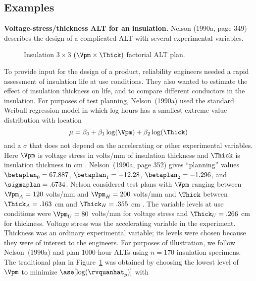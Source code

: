 \subsection{Examples}

\begin{example}
\label{example:tvalt.insulation.volt.thick}
{\bf Voltage-stress/thickness ALT for an insulation.}  Nelson
(1990a, page 349) describes the design of a complicated ALT with
several experimental variables.
\begin{figure}
\caption{Insulation  $3 \times 3$ $ (\Vpm \times \Thick)$
factorial ALT plan.}
\label{figure:nelson.tvalt.ps}
\end{figure}
To provide input for the design of a product, reliability engineers
needed a rapid assessment of insulation life at use conditions. They
also wanted to estimate the effect of insulation thickness on life,
and to compare different conductors in the insulation.  For purposes
of test planning, Nelson~(1990a) used the standard Weibull regression
model in which log hours has a smallest extreme value distribution
with location
\begin{displaymath}
\mu=\beta_{0}+\beta_{1} \log(\Vpm) + \beta_{2} \log(\Thick)
\end{displaymath}
and a $\sigma$ that does not depend on the accelerating or other
experimental variables. Here $\Vpm$ is voltage stress in volts/mm of
insulation thickness and $\Thick$ is insulation thickness in cm .
Nelson~(1990a, page 352) gives ``planning'' values
$\betaplan_{0}=67.887$, $\betaplan_{1}=-12.28$,
$\betaplan_{2}=-1.296$, and $\sigmaplan=.6734$.  Nelson considered
test plans with $\Vpm$ ranging between $\Vpm_{A}=120$ volts/mm and
$\Vpm_{H}=200$ volts/mm and $\Thick$ between $\Thick_{A}=.163$ cm 
and $\Thick_{H}=.355$ cm .  The variable levels at use conditions
were $\Vpm_{U}=80$ volts/mm for voltage stress and $\Thick_{U}=.266$
cm  for thickness.  Voltage stress was the accelerating variable in
the experiment.  Thickness was an ordinary experimental variable;
its levels were chosen because they were of interest to the
engineers.  For purposes of illustration, we follow
Nelson~(1990a) and plan 1000-hour ALTs using
$n=170$ insulation specimens.  The traditional plan in
Figure~\ref{figure:nelson.tvalt.ps} was obtained by choosing the
lowest level of $\Vpm$ to minimize $\ase[\log(\rvquanhat_{p})]$ with

\end{example}
